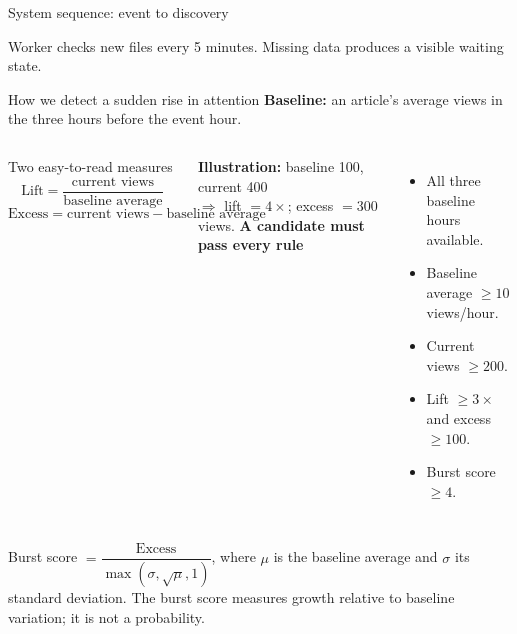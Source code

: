 \documentclass[aspectratio=169,10pt]{beamer}
\newcommand{\takeaway}[1]{\vfill{\color{Lime}\small #1}}
\begin{document}
\begin{frame}{System sequence: event to discovery}
\centering
{}
\takeaway{Worker checks new files every 5 minutes. Missing data produces a visible waiting state.}
\end{frame}

\begin{frame}{How we detect a sudden rise in attention}
\textbf{Baseline:} an article's average views in the three hours before the event hour.
\vspace{3mm}
\begin{columns}[T]
\begin{block}{Two easy-to-read measures}
\[
\text{Lift}=\frac{\text{current views}}{\text{baseline average}}
\]
\[
\text{Excess}=\text{current views}-\text{baseline average}
\]
\end{block}
\small\textbf{Illustration:} baseline 100, current 400\\
$\Rightarrow$ lift $=4\times$; excess $=300$ views.
\textbf{A candidate must pass every rule}
\begin{itemize}\setlength\itemsep{2mm}
\item All three baseline hours available.
\item Baseline average $\geq10$ views/hour.
\item Current views $\geq200$.
\item Lift $\geq3\times$ and excess $\geq100$.
\item Burst score $\geq4$.
\end{itemize}
\end{columns}
\vspace{2mm}
\small Burst score $=\dfrac{\text{Excess}}{\max(\sigma,\sqrt{\mu},1)}$, where $\mu$ is the baseline average and $\sigma$ its standard deviation.
\takeaway{The burst score measures growth relative to baseline variation; it is not a probability.}
\end{frame}
\end{document}
